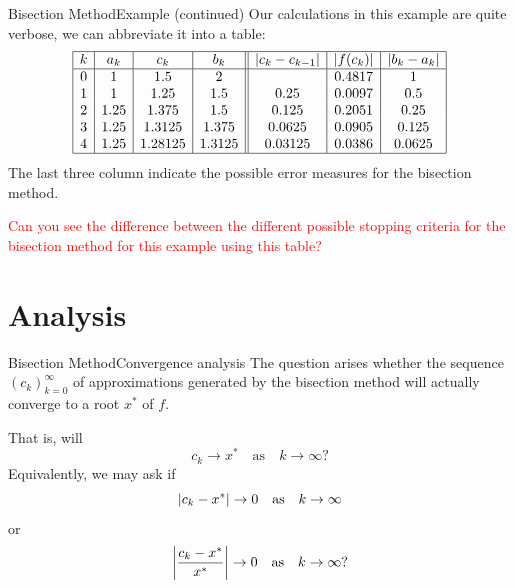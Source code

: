 \documentclass[12pt,aspectratio=169,envcountset]{beamer}
\DeclarePairedDelimiter{\abs}{\lvert}{\rvert}
\begin{document}
\begin{frame}{Bisection Method}{Example (continued)}
  Our calculations in this example are quite verbose, we can abbreviate it into
  a table:
  \[
    \begin{array}{|c|c|c|c||c|c|c|}
      \hline
      k & a_k & c_k & b_k & \abs{c_k - c_{k-1}} & \abs{f(c_k)} & \abs{b_k - a_k} \\
      \hline
      0 & 1 & 1.5 & 2 & & 0.4817 & 1 \\
      1 & 1 & 1.25 & 1.5 & 0.25 & 0.0097 & 0.5 \\
      2 & 1.25 & 1.375 & 1.5 & 0.125 & 0.2051 & 0.25 \\
      3 & 1.25 & 1.3125 & 1.375 & 0.0625 & 0.0905 & 0.125 \\
      4 & 1.25 & 1.28125 & 1.3125 & 0.03125 & 0.0386 & 0.0625 \\
      \hline
    \end{array}
  \]
  The last three column indicate the possible error measures for the bisection
  method.

  \textcolor{red}{Can you see the difference between the different possible
  stopping criteria for the bisection method for this example using this table?}
\end{frame}

\section{Analysis}

\begin{frame}{Bisection Method}{Convergence analysis}
  The question arises whether the sequence $(c_k)_{k=0}^\infty$ of
  approximations generated by the bisection method will actually converge to a
  root $x^*$ of $f$.

  That is, will
  \[
    c_k \to x^*
    \quad \text{as} \quad
    k \to \infty?
  \]
  Equivalently, we may ask if
  \[
    \abs{c_k - x^*} \to 0
    \quad \text{as} \quad
    k \to \infty
  \]
  or
  \[
    \abs*{\frac{c_k - x^*}{x^*}} \to 0
    \quad \text{as} \quad
    k \to \infty?
  \]
\end{frame}
\end{document}
